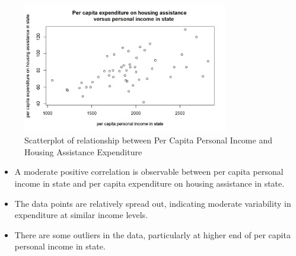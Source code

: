 \documentclass[12pt,letterpaper]{article}
\begin{document}

\begin{figure}[H]
	\caption{Scatterplot of relationship between Per Capita Personal Income and Housing Assistance Expenditure}
	\centering
	\includegraphics[width=0.8\textwidth]{Figure_2_2.png}
\end{figure}

\begin{itemize}
\item 
A moderate positive correlation is observable between per capita personal income in state and per capita expenditure on housing assistance in state. 
\item 
The data points are relatively spread out, indicating moderate variability in expenditure at similar income levels.  
\item 
There are some outliers in the data, particularly at higher end of per capita personal income in state. 
\end{itemize}
\end{document}
